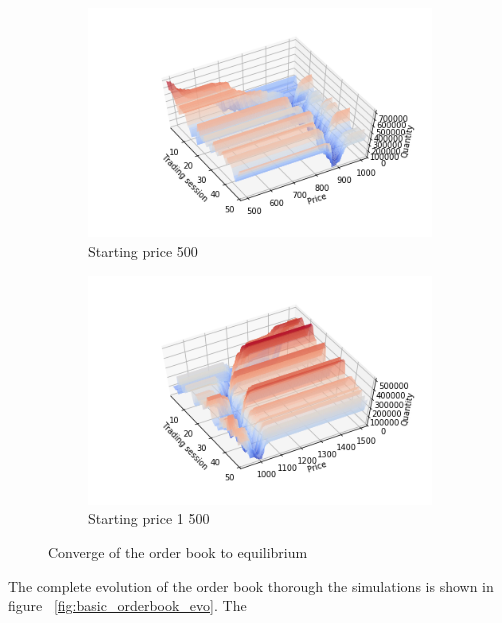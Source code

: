 \begin{figure}
    \centering
    \begin{subfigure}{.5\textwidth}
      \centering
      \includegraphics[width=\linewidth]{plots/basic_market_depth_converge_lower.png}
      \caption{Starting price 500}
      \label{fig:market_depth_lower}
    \end{subfigure}%
    \begin{subfigure}{.5\textwidth}
      \centering
      \includegraphics[width=\linewidth]{plots/basic_market_depth_converge_higher.png}
      \caption{Starting price 1 500}
      \label{fig:market_depth_higher}
    \end{subfigure}
    \caption{Converge of the order book to equilibrium}
    \label{fig:market_depths}
\end{figure}

The complete evolution of the order book thorough the simulations is shown in figure
~\ref{fig:basic_orderbook_evo}. The 

